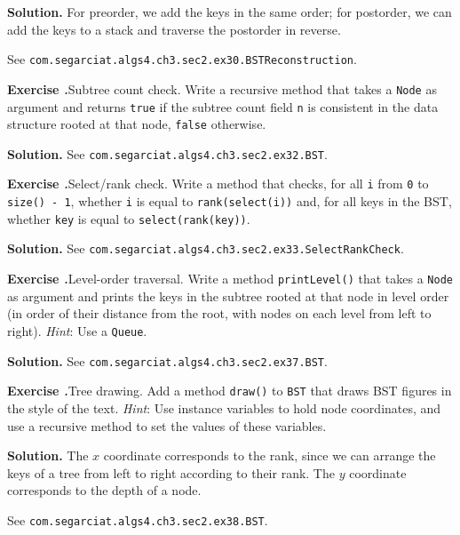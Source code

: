 \documentclass[12pt, a4paper]{article}
\newenvironment{ex}[2][Exercise]
{\par\medskip\noindent \textbf{#1 #2.}}
{\medskip}
\newenvironment{sol}[1][Solution]
{\par\medskip\noindent \textbf{#1.} }
{\medskip}
\begin{document}
	\begin{sol}
		For preorder, we add the keys in the same order; for postorder, we can add
		the keys to a stack and traverse the postorder in reverse.
		
		See \texttt{com.segarciat.algs4.ch3.sec2.ex30.BSTReconstruction}.
	\end{sol}
	\begin{ex}{32}
		\emph{Subtree count check}. Write a recursive method that takes a \texttt{Node}
		as argument and returns \texttt{true} if the subtree count field \texttt{n} is
		consistent in the data structure rooted at that node, \texttt{false} otherwise.
	\end{ex}
	\begin{sol}
		See \texttt{com.segarciat.algs4.ch3.sec2.ex32.BST}.
	\end{sol}
	\begin{ex}{33}
		\emph{Select/rank check}. Write a method that checks, for all \texttt{i} from \texttt{0}
		to \texttt{size() - 1}, whether \texttt{i} is equal to \texttt{rank(select(i))} and,
		for all keys in the BST, whether \texttt{key} is equal to \texttt{select(rank(key))}.
	\end{ex}
	\begin{sol}
		See \texttt{com.segarciat.algs4.ch3.sec2.ex33.SelectRankCheck}.
	\end{sol}
	\begin{ex}{37}
		\emph{Level-order traversal}. Write a method \texttt{printLevel()} that takes
		a \texttt{Node} as argument and prints the keys in the subtree rooted at that
		node in level order (in order of their distance from the root, with nodes
		on each level from left to right). \emph{Hint}: Use a \texttt{Queue}.
	\end{ex}
	\begin{sol}
		See \texttt{com.segarciat.algs4.ch3.sec2.ex37.BST}.
	\end{sol}
	\begin{ex}{38}
		\emph{Tree drawing}. Add a method \texttt{draw()} to \texttt{BST} that draws
		BST figures in the style of the text. \emph{Hint}: Use instance variables to hold
		node coordinates, and use a recursive method to set the values of these variables.
	\end{ex}
	\begin{sol}
		The $x$ coordinate corresponds to the rank, since we can arrange the keys of
		a tree from left to right according to their rank. The $y$ coordinate corresponds
		to the depth of a node.
		
		See \texttt{com.segarciat.algs4.ch3.sec2.ex38.BST}.
	\end{sol}
	\pagebreak
	\printbibliography
\end{document}
